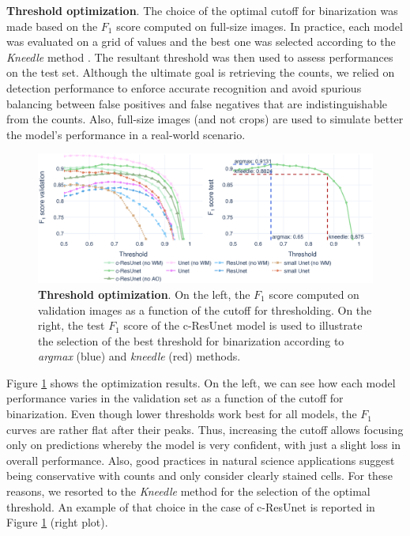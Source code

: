 \noindent\textbf{Threshold optimization}.
The choice of the optimal cutoff for binarization was made based on the $F_1$ score computed on full-size images. In practice, each model was evaluated on a grid of values and the best one was selected according to the \textit{Kneedle} method \cite{kneedle}. The resultant threshold was then used to assess performances on the test set.
Although the ultimate goal is retrieving the counts, we relied on detection performance to enforce accurate recognition and avoid spurious balancing between false positives and false negatives that are indistinguishable from the counts.
Also, full-size images (and not crops) are used to simulate better the model's performance in a real-world scenario.
\begin{figure}
\centerline{
\includegraphics[width=0.8\linewidth]{figures/130_methods/F1_optimization.eps}
}
\caption{\textbf{Threshold optimization}. On the left, the $F_{1}$ score computed on validation images as a function of the cutoff for thresholding.
On the right, the test $F_1$ score of the c-ResUnet model is used to illustrate the selection of the best threshold for binarization according to \textit{argmax} (blue) and \textit{kneedle} (red) methods.
} 
\label{fig:thresh_opt}
\end{figure}

Figure \ref{fig:thresh_opt} shows the optimization results. On the left, we can see how each model performance varies in the validation set as a function of the cutoff for binarization.
Even though lower thresholds work best for all models, the $F_1$ curves are rather flat after their peaks. Thus, increasing the cutoff allows focusing only on predictions whereby the model is very confident, with just a slight loss in overall performance.
Also, good practices in natural science applications suggest being conservative with counts and only consider clearly stained cells.
For these reasons, we resorted to the \textit{Kneedle} method \cite{kneedle} for the selection of the optimal threshold. An example of that choice in the case of c-ResUnet is reported in Figure \ref{fig:thresh_opt} (right plot).
